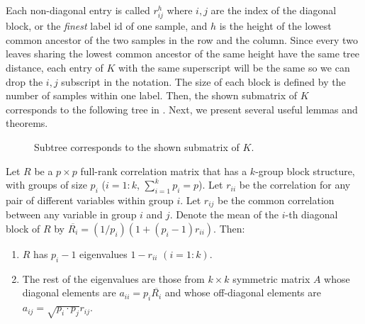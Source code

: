 Each non-diagonal entry is called $r_{ij}^h$ where $i,j$ are the index of the diagonal block, or the \emph{finest} label id of one sample, and $h$ is the height of the lowest common ancestor of the two samples in the row and the column. Since every two leaves sharing the lowest common ancestor of the same height have the same tree distance, each entry of $K$ with the same superscript will be the same so we can drop the $i,j$ subscript in the notation. The size of each block is defined by the number of samples within one label. Then, the shown submatrix of $K$ corresponds to the following tree in . Next, we present several useful lemmas and theorems.

\begin{figure}[ht]
    \centering
\caption{Subtree corresponds to the shown submatrix of $K$.}
\label{fig:subtree}
\end{figure}


\begin{theorem}
\label{thm:block}
    Let $R$ be a $p \times p$ full-rank correlation matrix that has a $k$-group block structure, with groups of size $p_i$ ($i = 1 : k$, $\sum\limits_{i=1}^k p_i = p$). Let $r_{ii}$ be the correlation for any pair of different variables within group $i$. Let $r_{ij}$ be the common correlation between any variable in group $i$ and $j$. Denote the mean of the $i$-th diagonal block of $R$ by $\overline{R_i} = (1/p_i)(1 + (p_i - 1)r_{ii})$. Then:
    \begin{enumerate}
        \item $R$ has $p_i - 1$ eigenvalues $1 - r_{ii}$ $(i = 1 : k)$.
        \item The rest of the eigenvalues are those from $k \times k$ symmetric matrix $A$ whose diagonal elements are $a_{ii} = p_i\overline{R_i}$ and whose off-diagonal elements are $a_{ij} = \sqrt{p_i\cdot p_j}r_{ij}$.
    \end{enumerate}
\end{theorem}

